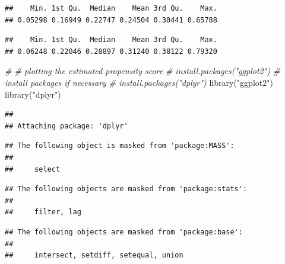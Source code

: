 \documentclass[
  10pt,
]{book}
\newenvironment{Shaded}{\begin{snugshade}}{\end{snugshade}}
\newcommand{\CommentTok}[1]{\textcolor[rgb]{0.56,0.35,0.01}{\textit{#1}}}
\newcommand{\DecValTok}[1]{\textcolor[rgb]{0.00,0.00,0.81}{#1}}
\newcommand{\FunctionTok}[1]{\textcolor[rgb]{0.00,0.00,0.00}{#1}}
\newcommand{\NormalTok}[1]{#1}
\newcommand{\SpecialCharTok}[1]{\textcolor[rgb]{0.00,0.00,0.00}{#1}}
\newcommand{\StringTok}[1]{\textcolor[rgb]{0.31,0.60,0.02}{#1}}
\begin{document}
\begin{verbatim}
##    Min. 1st Qu.  Median    Mean 3rd Qu.    Max. 
## 0.05298 0.16949 0.22747 0.24504 0.30441 0.65788
\end{verbatim}

\begin{Shaded}
\end{Shaded}

\begin{verbatim}
##    Min. 1st Qu.  Median    Mean 3rd Qu.    Max. 
## 0.06248 0.22046 0.28897 0.31240 0.38122 0.79320
\end{verbatim}

\begin{Shaded}
\begin{Highlighting}[]
\CommentTok{\# \# plotting the estimated propensity score}
\CommentTok{\# install.packages("ggplot2") \# install packages if necessary}
\CommentTok{\# install.packages("dplyr")}
\FunctionTok{library}\NormalTok{(}\StringTok{"ggplot2"}\NormalTok{)}
\FunctionTok{library}\NormalTok{(}\StringTok{"dplyr"}\NormalTok{)}
\end{Highlighting}
\end{Shaded}

\begin{verbatim}
## 
## Attaching package: 'dplyr'
\end{verbatim}

\begin{verbatim}
## The following object is masked from 'package:MASS':
## 
##     select
\end{verbatim}

\begin{verbatim}
## The following objects are masked from 'package:stats':
## 
##     filter, lag
\end{verbatim}

\begin{verbatim}
## The following objects are masked from 'package:base':
## 
##     intersect, setdiff, setequal, union
\end{verbatim}
\end{document}
